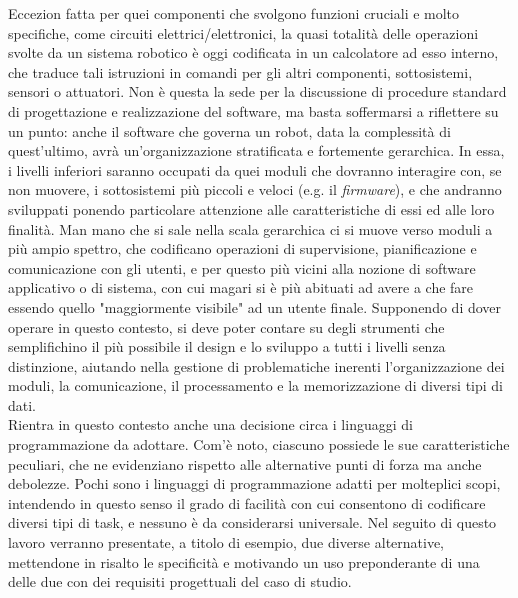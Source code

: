 \indent Eccezion fatta per quei componenti che svolgono funzioni cruciali e molto specifiche, come circuiti elettrici/elettronici, la quasi totalità delle operazioni svolte da un sistema robotico è oggi codificata in un calcolatore ad esso interno, che traduce tali istruzioni in comandi per gli altri componenti, sottosistemi, sensori o attuatori. Non è questa la sede per la discussione di procedure standard di progettazione e realizzazione del software, ma basta soffermarsi a riflettere su un punto: anche il software che governa un robot, data la complessità di quest'ultimo, avrà un'organizzazione stratificata e fortemente gerarchica. In essa, i livelli inferiori saranno occupati da quei moduli che dovranno interagire con, se non muovere, i sottosistemi più piccoli e veloci (e.g. il \emph{firmware}), e che andranno sviluppati ponendo particolare attenzione alle caratteristiche di essi ed alle loro finalità. Man mano che si sale nella scala gerarchica ci si muove verso moduli a più ampio spettro, che codificano operazioni di supervisione, pianificazione e comunicazione con gli utenti, e per questo più vicini alla nozione di software applicativo o di sistema, con cui magari si è più abituati ad avere a che fare essendo quello "maggiormente visibile" ad un utente finale. Supponendo di dover operare in questo contesto, si deve poter contare su degli strumenti che semplifichino il più possibile il design e lo sviluppo a tutti i livelli senza distinzione, aiutando nella gestione di problematiche inerenti l'organizzazione dei moduli, la comunicazione, il processamento e la memorizzazione di diversi tipi di dati.\\
Rientra in questo contesto anche una decisione circa i linguaggi di programmazione da adottare. Com'è noto, ciascuno possiede le sue caratteristiche peculiari, che ne evidenziano rispetto alle alternative punti di forza ma anche debolezze. Pochi sono i linguaggi di programmazione adatti per molteplici scopi, intendendo in questo senso il grado di facilità con cui consentono di codificare diversi tipi di task, e nessuno è da considerarsi universale. Nel seguito di questo lavoro verranno presentate, a titolo di esempio, due diverse alternative, mettendone in risalto le specificità e motivando un uso preponderante di una delle due con dei requisiti progettuali del caso di studio.

